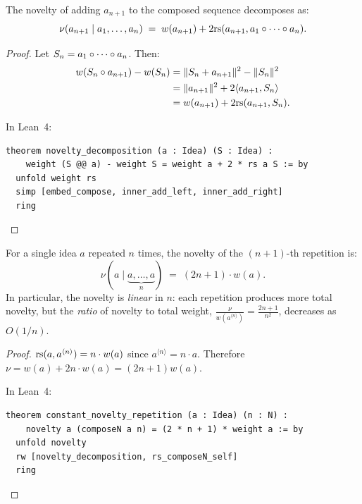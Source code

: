 \begin{theorem}
\label{thm:novelty-decomp}
The novelty of adding $a_{n+1}$ to the composed sequence decomposes as:
\[
  \nu(a_{n+1} \mid a_1, \ldots, a_n)
  \;=\; w(a_{n+1}) + 2\mathrm{rs}(a_{n+1}, a_1 \circ \cdots \circ a_n).
\]
\end{theorem}

\begin{proof}
Let $S_n = a_1 \circ \cdots \circ a_n$.  Then:
\begin{align*}
  w(S_n \circ a_{n+1}) - w(S_n)
  &= \|S_n + a_{n+1}\|^2 - \|S_n\|^2 \\
  &= \|a_{n+1}\|^2 + 2\langle a_{n+1}, S_n \rangle \\
  &= w(a_{n+1}) + 2\mathrm{rs}(a_{n+1}, S_n).
\end{align*}

In Lean~4:
\begin{lstlisting}
theorem novelty_decomposition (a : Idea) (S : Idea) :
    weight (S @@ a) - weight S = weight a + 2 * rs a S := by
  unfold weight rs
  simp [embed_compose, inner_add_left, inner_add_right]
  ring
\end{lstlisting}
\end{proof}

\begin{theorem}
\label{thm:constant-novelty}
For a single idea $a$ repeated $n$ times, the novelty of the $(n+1)$-th
repetition is:
\[
  \nu(a \mid \underbrace{a, \ldots, a}_{n})
  \;=\; (2n + 1) \cdot w(a).
\]
In particular, the novelty is \emph{linear} in $n$: each repetition produces
more total novelty, but the \emph{ratio} of novelty to total weight,
$\frac{\nu}{w(a^{\langle n \rangle})} = \frac{2n+1}{n^2}$, decreases as $O(1/n)$.
\end{theorem}

\begin{proof}
$\mathrm{rs}(a, a^{\langle n \rangle}) = n \cdot w(a)$ since
$a^{\langle n \rangle} = n \cdot a$.  Therefore
$\nu = w(a) + 2n \cdot w(a) = (2n+1) w(a)$.

In Lean~4:
\begin{lstlisting}
theorem constant_novelty_repetition (a : Idea) (n : N) :
    novelty a (composeN a n) = (2 * n + 1) * weight a := by
  unfold novelty
  rw [novelty_decomposition, rs_composeN_self]
  ring
\end{lstlisting}
\end{proof}

